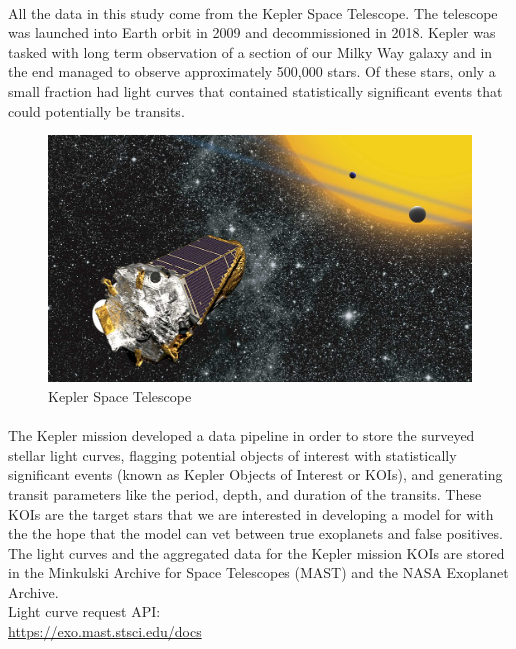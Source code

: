 \documentclass{article}
\begin{document}
\paragraph{}All the data in this study come from the Kepler Space Telescope. The telescope was launched into Earth orbit in 2009 and decommissioned in 2018. Kepler was tasked with long term observation of a section of our Milky Way galaxy and in the end managed to observe approximately 500,000 stars. Of these stars, only a small fraction had light curves that contained statistically significant events that could potentially be transits. 
 \begin{figure}[H]
	\begin{center}
		\includegraphics[totalheight=6cm]{figures/kepler_spacetelescope.jpg}
	\end{center}
	\caption{Kepler Space Telescope}
\end{figure}
\paragraph{} The Kepler mission developed a data pipeline in order to store the surveyed stellar light curves, flagging potential objects of interest with statistically significant events (known as Kepler Objects of Interest or KOIs), and generating transit parameters like the period, depth, and duration of the transits. These KOIs are the target stars that we are interested in developing a model for with the the hope that the model can vet between true exoplanets and false positives. The light curves and the aggregated data for the Kepler mission KOIs are stored in the Minkulski Archive for Space Telescopes (MAST) and the NASA Exoplanet Archive. \\

Light curve request API: \\ \href{https://exo.mast.stsci.edu/docs/getting_started.html}{https://exo.mast.stsci.edu/docs}
\end{document}
